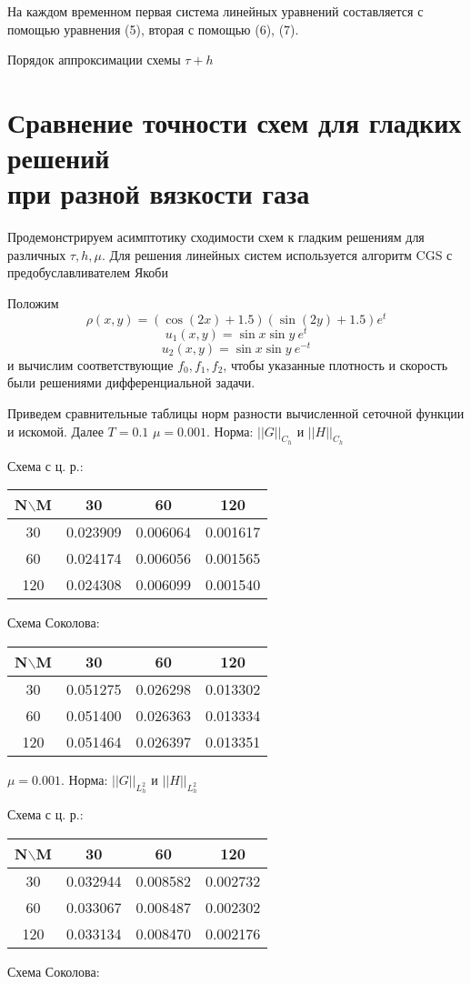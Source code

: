 \documentclass[specialist,subf,href,colorlinks=true,14pt,times,mtpro]{disser}
\begin{document}
На каждом временном первая система линейных уравнений составляется с помощью уравнения (5), вторая с помощью (6), (7).

Порядок аппроксимации схемы $\tau + h$

\section{Сравнение точности схем для гладких решений \\ при разной вязкости газа}

Продемонстрируем асимптотику сходимости схем к гладким решениям для различных $\tau, h, \mu$. Для решения линейных систем используется алгоритм CGS с предобуславливателем Якоби

Положим 
$$\rho (x, y) = (\cos (2  x) + 1.5)(\sin (2  y) + 1.5) e^t$$
$$u_1 (x, y) = \sin x \sin y\  e^t$$
$$u_2 (x, y) = \sin x \sin y\  e^{-t}$$
и вычислим соответствующие $f_0, f_1, f_2$, чтобы указанные плотность и скорость были решениями дифференциальной задачи.

Приведем сравнительные таблицы норм разности вычисленной сеточной функции и искомой. Далее $T = 0.1$
\newpage
$\mu = 0.001.$ Норма:  $||G||_{C_h}$ и $||H||_{C_h}$

Схема с ц. р.:

\begin{tabular}{|c|c|c|c|}
\hline
N$\backslash$M & 30 & 60 & 120 \\
\hline
30 & 0.023909 & 0.006064 & 0.001617 \\
\hline
60 & 0.024174 & 0.006056 & 0.001565 \\
\hline
120 & 0.024308 & 0.006099 & 0.001540 \\
\hline
\end{tabular}
\BlankLine
Схема Соколова:

\begin{tabular}{|c|c|c|c|}
    \hline
    N$\backslash$M & 30 & 60 & 120 \\
    \hline
    30 & 0.051275 & 0.026298 & 0.013302 \\
    \hline
    60 & 0.051400 & 0.026363 & 0.013334 \\
    \hline
    120 & 0.051464 & 0.026397 & 0.013351 \\
    \hline
\end{tabular}
\BlankLine
\BlankLine
\BlankLine
$\mu = 0.001.$ Норма:  $||G||_{L^2_h}$ и $||H||_{L^2_h}$

Схема с ц. р.:

\begin{tabular}{|c|c|c|c|}
    \hline
    N$\backslash$M & 30 & 60 & 120 \\
    \hline
    30 &   0.032944 & 0.008582 & 0.002732 \\
    \hline
    60 & 0.033067 & 0.008487 & 0.002302 \\
    \hline
    120 & 0.033134 & 0.008470 & 0.002176 \\
    \hline
\end{tabular}
\BlankLine
Схема Соколова:
\end{document}
